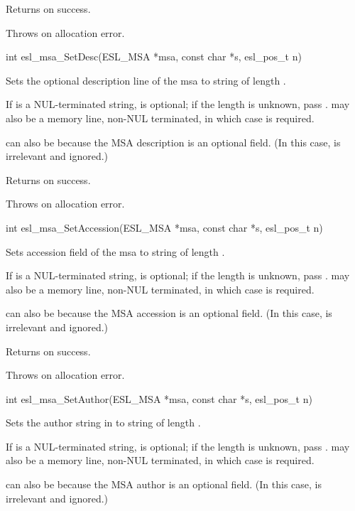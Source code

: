 \begin{sreapi}
Returns  on success.

Throws  on allocation error.


\hypertarget{func:esl_msa_SetDesc()}
{\item[int esl\_msa\_SetDesc(ESL\_MSA *msa, const char *s, esl\_pos\_t n)]}

Sets the optional description line of the msa  to
string  of length .

If  is a NUL-terminated string,  is optional; if
the length is unknown, pass .  may also be a
memory line, non-NUL terminated, in which case  is
required.

 can also be  because the MSA description is an
optional field. (In this case,  is irrelevant and
ignored.)

Returns  on success.

Throws  on allocation error.


\hypertarget{func:esl_msa_SetAccession()}
{\item[int esl\_msa\_SetAccession(ESL\_MSA *msa, const char *s, esl\_pos\_t n)]}

Sets accession field of the msa  to string  of
length .

If  is a NUL-terminated string,  is optional; if
the length is unknown, pass .  may also be a
memory line, non-NUL terminated, in which case  is
required.

 can also be  because the MSA accession is an
optional field. (In this case,  is irrelevant and
ignored.)

Returns  on success.

Throws  on allocation error.


\hypertarget{func:esl_msa_SetAuthor()}
{\item[int esl\_msa\_SetAuthor(ESL\_MSA *msa, const char *s, esl\_pos\_t n)]}

Sets the author string in  to string  of
length .

If  is a NUL-terminated string,  is optional; if
the length is unknown, pass .  may also be a
memory line, non-NUL terminated, in which case  is
required.

 can also be  because the MSA author is an
optional field. (In this case,  is irrelevant and
ignored.)


\end{sreapi}
